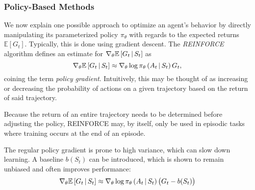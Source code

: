 \subsubsection{Policy-Based Methods}
We now explain one possible approach to optimize an agent's behavior by directly manipulating its parameterized policy $\pi_\theta$ with regards to the expected returns $\mathbb{E}\left[G_t\right]$. Typically, this is done using gradient descent. The \textit{REINFORCE} algorithm \cite{reinforce} defines an estimate for $\nabla_\theta \mathbb{E}\left[G_t \,\middle|\, S_t \right]$ as
\begin{equation*}
    \nabla_\theta \mathbb{E}\left[G_t \,\middle|\, S_t \right] \approx \nabla_\theta \log \pi_\theta\left(A_t \,\middle|\, S_t\right) G_t,
\end{equation*}
coining the term \textit{policy gradient}. Intuitively, this may be thought of as increasing or decreasing the probability of actions on a given trajectory based on the return of said trajectory.

Because the return of an entire trajectory needs to be determined before adjusting the policy, REINFORCE may, by itself, only be used in episodic tasks where training occurs at the end of an episode.

The regular policy gradient is prone to high variance, which can slow down learning. A baseline $b(S_t)$ can be introduced, which is shown to remain unbiased and often improves performance:
\begin{equation*}
    \nabla_\theta \mathbb{E}\left[G_t \,\middle|\, S_t \right] \approx \nabla_\theta \log \pi_\theta\left(A_t \,\middle|\, S_t\right) \left(G_t - b(S_t)\right)
\end{equation*}